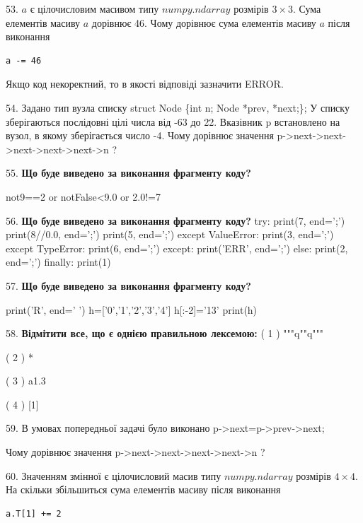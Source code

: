 \documentclass[11pt]{article}
\begin{document}
\par\vspace{5mm}
53. 
$a$ є цілочисловим масивом типу $numpy.ndarray$ розмірів $3{\times}3$. Сума елементів масиву $a$ дорівнює 46. Чому дорівнює сума елементів масиву $a$ після виконання 
\begin{verbatim}
a -= 46
\end{verbatim}


Якщо код некоректний, то в якості відповіді зазначити ERROR.


\par\vspace{5mm}
54. 
Задано тип вузла списку
struct Node \{int n; Node *prev, *next;\};
У списку зберігаються послідовні цілі числа від -63 до 22. Вказівник p встановлено на вузол, в якому зберігається число -4.
Чому дорівнює значення p->next->next->next->next->next->n ?\par\vspace{5mm}
55. \textbf{Що буде виведено за виконання фрагменту коду?}

not9==2 or notFalse<9.0 or 2.0!=7
\par\vspace{5mm}
56. \textbf{Що буде виведено за виконання фрагменту коду?}
try:
    print(7, end=';')
    print(8//0.0, end=';')
    print(5, end=';')
except ValueError:
    print(3, end=';')
except TypeError:
    print(6, end=';')
except:
    print('ERR', end=';')
else:
    print(2, end=';')
finally:
    print(1)
\par\vspace{5mm}
57. \textbf{Що буде виведено за виконання фрагменту коду?}

print('R', end=' ')
h=['0','1','2','3','4']
h[:-2]='13'
print(h)

\par\vspace{5mm}
58. %
\textbf{Відмітити все, що є однією правильною лексемою:}
( 1 ) """q""q"""

( 2 ) *

( 3 ) a1.3

( 4 ) [1]
\par\vspace{5mm}
59. 
В умовах попередньої задачі було виконано p->next=p->prev->next;

Чому дорівнює значення p->next->next->next->next->n ?\par\vspace{5mm}
60. 
Значенням змінної  є цілочисловий масив типу $numpy.ndarray$ розмірів $4{\times}4$. На скільки збільшиться сума елементів масиву  після виконання
\begin{verbatim}
a.T[1] += 2
\end{verbatim}
\end{document}
